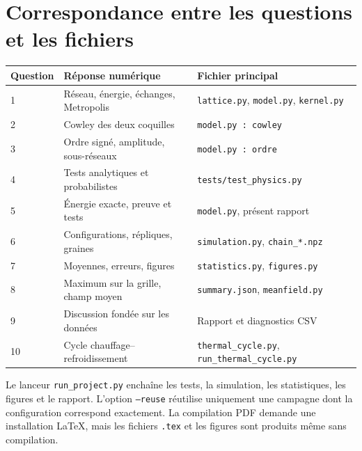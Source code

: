 \documentclass[10pt,a4paper]{article}
\begin{document}
\section{Correspondance entre les questions et les fichiers}
\begin{center}\small
\begin{tabular}{p{.12\linewidth}p{.40\linewidth}p{.38\linewidth}}
\toprule
Question & Réponse numérique & Fichier principal\\
\midrule
1 & Réseau, énergie, échanges, Metropolis & \texttt{lattice.py}, \texttt{model.py}, \texttt{kernel.py}\\
2 & Cowley des deux coquilles & \texttt{model.py : cowley}\\
3 & Ordre signé, amplitude, sous-réseaux & \texttt{model.py : ordre}\\
4 & Tests analytiques et probabilistes & \texttt{tests/test\_physics.py}\\
5 & Énergie exacte, preuve et tests & \texttt{model.py}, présent rapport\\
6 & Configurations, répliques, graines & \texttt{simulation.py}, \texttt{chain\_*.npz}\\
7 & Moyennes, erreurs, figures & \texttt{statistics.py}, \texttt{figures.py}\\
8 & Maximum sur la grille, champ moyen & \texttt{summary.json}, \texttt{meanfield.py}\\
9 & Discussion fondée sur les données & Rapport et diagnostics CSV\\
10 & Cycle chauffage--refroidissement & \texttt{thermal\_cycle.py}, \texttt{run\_thermal\_cycle.py}\\
\bottomrule
\end{tabular}\end{center}

Le lanceur \texttt{run\_project.py} enchaîne les tests, la simulation, les
statistiques, les figures et le rapport. L'option \texttt{--reuse} réutilise
uniquement une campagne dont la configuration correspond exactement.
La compilation PDF demande une installation LaTeX, mais les fichiers
\texttt{.tex} et les figures sont produits même sans compilation.
\end{document}
